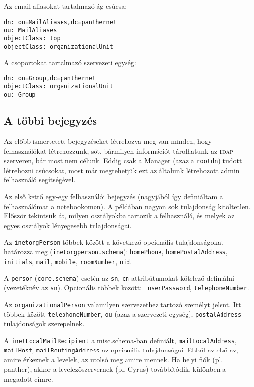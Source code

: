 \noindent Az email aliasokat tartalmazó ág csúcsa:

\begin{Verbatim}[frame=single]
dn: ou=MailAliases,dc=panthernet
ou: MailAliases
objectClass: top
objectClass: organizationalUnit
\end{Verbatim}


\noindent A csoportokat tartalmazó szervezeti egység:

\begin{Verbatim}[frame=single]
dn: ou=Group,dc=panthernet
objectClass: organizationalUnit
ou: Group
\end{Verbatim}



\subsection{A többi bejegyzés}
Az előbb ismertetett bejegyzéseket létrehozva meg van minden, hogy felhasználókat létrehozzunk, sőt, bármilyen
információt tárolhatunk az \textsc{ldap} szerveren, bár most nem célunk. Eddig csak a Manager (azaz a \texttt{rootdn}) tudott
létrehozni csúcsokat, most már megtehetjük ezt az általunk létrehozott admin felhasználó segítségével.


Az első kettő egy-egy felhasználói bejegyzés (nagyjából így definiáltam a felhasználómat a notebookomon).
A példában nagyon sok tulajdonság kitöltetlen. Először tekintsük át, milyen osztályokba tartozik a felhasználó, és
melyek az egyes osztályok lényegesebb tulajdonságai.

Az \texttt{inetorgPerson} többek között a következő opcionális tulajdonságokat határozza meg
(\texttt{inetorgperson.schema}):
\texttt{homePhone}, \texttt{homePostalAddress}, \texttt{initials}, \texttt{mail},  \texttt{mobile},
\texttt{roomNumber}, \texttt{uid}.

A \texttt{person} (\texttt{core.schema}) esetén az \texttt{sn}, \texttt{cn} attribútumokat kötelező definiálni
(vezetéknév az \texttt{sn}). Opcionális többek között: \texttt{ userPassword}, \texttt{telephoneNumber}.

Az \texttt{organizationalPerson} valamilyen szervezethez tartozó személyt jelent. Itt többek között
\texttt{telephoneNumber}, \texttt{ou} (azaz a szervezeti egység), \texttt{postalAddress} tulajdonságok szerepelnek.

A \texttt{inetLocalMailRecipient} a misc.schema-ban definiált, \texttt{mailLocalAddress}, \texttt{mailHost},
\texttt{mailRoutingAddress} az opcionális tulajdonságai. Ebből az első az, amire érkeznek a levelek, az utolsó meg
amire mennek. Ha helyi fiók (pl. panther), akkor a levelezőszervernek (pl. Cyrus) továbbítódik, különben a megadott
címre.

